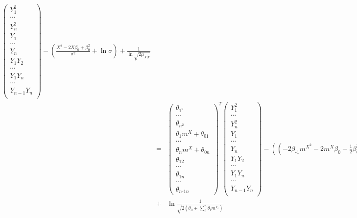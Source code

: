 \documentclass[11pt, oneside]{article}   	%
\numberwithin{figure}{section}
\numberwithin{equation}{section}
\numberwithin{table}{section}
\theoremstyle{definition}
\begin{document}
\begin{appendices}
\begin{itemize}
\begin{eqnarray*}
\begin{pmatrix}
Y_1^2\\
\cdots\\
Y_n^2\\
Y_1\\
\cdots\\
Y_n\\
Y_1 Y_2\\
\cdots\\
Y_1 Y_n\\
\cdots\\
Y_{n-1}Y_{n}\\
\end{pmatrix}
- \left( \frac{X^2 -2X\beta_0 +\beta_0^2}{\sigma^2} + \ln{\sigma} \right) + \frac{1}{\ln{\sqrt{2\mu_{X|Y}}}}\\
&=&
\begin{pmatrix}
\theta_{1^2}\\
\cdots\\
\theta_{n^2}\\
\theta_1 m^X+\theta_{01}\\
\cdots\\
\theta_n m^X+\theta_{0n}\\
\theta_{12}\\
\cdots\\
\theta_{1n}\\
\cdots\\
\theta_{n\mbox{-}1n}
\end{pmatrix}^T
\begin{pmatrix}
Y_1^2\\
\cdots\\
Y_n^2\\
Y_1\\
\cdots\\
Y_n\\
Y_1 Y_2\\
\cdots\\
Y_1 Y_n\\
\cdots\\
Y_{n-1}Y_{n}\\
\end{pmatrix}
- \left( (-2\beta_{\mbox{-}1}m^{X^2} - 2m^{X}\beta_0 - \frac{1}{2}\beta_0^2 \beta_{\mbox{-}1}^{-1}) + \frac{\ln{(2\theta_{\mbox{-}1}})}{2} \right)\\
&+&
\ln{\frac{1}{\sqrt{2(\theta_0+\sum_i^n\theta_i m^{Y_i})}}} 
\end{eqnarray*}

\end{itemize}

\newpage

\end{appendices}
\end{document}
